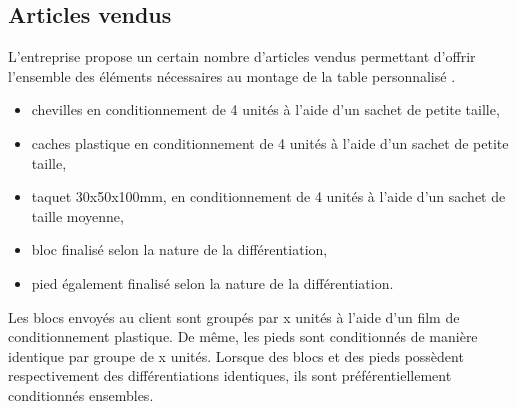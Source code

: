 \subsection{Articles vendus}

L'entreprise propose un certain nombre d'articles vendus permettant d'offrir
l'ensemble des éléments nécessaires au montage de la table
\og personnalisé \fg{}.

\begin{itemize}
	\item chevilles en conditionnement de 4 unités à l'aide d'un sachet
	de petite taille,
	\item caches plastique en conditionnement de 4 unités à l'aide d'un sachet
	de petite taille,
	\item taquet 30x50x100mm, en conditionnement de 4 unités à l'aide
	d'un sachet de taille moyenne,
	\item bloc finalisé selon la nature de la différentiation,
	\item pied également finalisé selon la nature de la différentiation.
\end{itemize}

Les blocs envoyés au client sont groupés par x unités à l'aide d'un
film de conditionnement plastique.
De même, les pieds sont conditionnés de manière identique par groupe de x
unités.
Lorsque des blocs et des pieds possèdent respectivement des différentiations
identiques, ils sont préférentiellement conditionnés ensembles.
